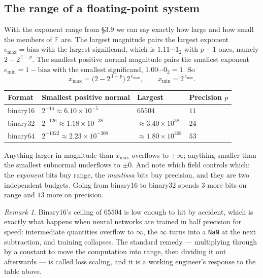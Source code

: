 \documentclass[11pt]{article}
\theoremstyle{plain}
\theoremstyle{definition}
\theoremstyle{remark}
\newtheorem*{rmk}{Remark}
\newcommand{\F}{\mathbb{F}}
\begin{document}
\subsection{The range of a floating-point system}
With the exponent range from \S3.9 we can say exactly how large and how small
the members of $\F$ are. The largest magnitude pairs the largest exponent
$e_{\max}=\text{bias}$ with the largest significand, which is
$1.11\cdots1_{2}$ with $p-1$ ones, namely $2-2^{\,1-p}$. The smallest positive
normal magnitude pairs the smallest exponent $e_{\min}=1-\text{bias}$ with the
smallest significand, $1.00\cdots0_{2}=1$. So
\[
  x_{\max} = \bigl(2-2^{\,1-p}\bigr)\,2^{\,e_{\max}},
  \qquad
  x_{\min} = 2^{\,e_{\min}} .
\]

\begin{center}
\renewcommand{\arraystretch}{1.3}
\begin{tabular}{@{}l l l l@{}}
\toprule
\textbf{Format} & \textbf{Smallest positive normal} & \textbf{Largest}
  & \textbf{Precision $p$} \\
\midrule
binary16 & $2^{-14}\approx6.10\times10^{-5}$    & $65504$
         & $11$ \\
binary32 & $2^{-126}\approx1.18\times10^{-38}$  & $\approx3.40\times10^{38}$
         & $24$ \\
binary64 & $2^{-1022}\approx2.23\times10^{-308}$& $\approx1.80\times10^{308}$
         & $53$ \\
\bottomrule
\end{tabular}
\end{center}

\noindent Anything larger in magnitude than $x_{\max}$ overflows to $\pm\infty$;
anything smaller than the smallest subnormal underflows to $\pm0$. And note
which field controls which: the \emph{exponent} bits buy range, the
\emph{mantissa} bits buy precision, and they are two independent budgets. Going
from binary16 to binary32 spends $3$ more bits on range and $13$ more on
precision.

\begin{rmk}
Binary16's ceiling of $65504$ is low enough to hit by accident, which is exactly
what happens when neural networks are trained in half precision for speed:
intermediate quantities overflow to $\infty$, the $\infty$ turns into a
\texttt{NaN} at the next subtraction, and training collapses. The standard
remedy --- multiplying through by a constant to move the computation into range,
then dividing it out afterwards --- is called loss scaling, and it is a working
engineer's response to the table above.
\end{rmk}
\end{document}

